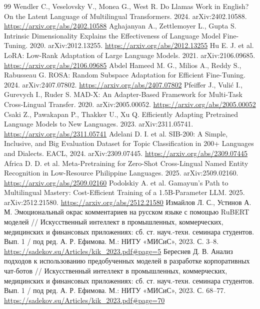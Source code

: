 \documentclass{misisarticle}
\begin{document}
\begin{thebibliography}{99}
 Wendler C., Veselovsky V., Monea G., West R. Do Llamas Work in English? On the Latent Language of Multilingual Transformers. 2024. arXiv:2402.10588. \url{https://arxiv.org/abs/2402.10588}
 Aghajanyan A., Zettlemoyer L., Gupta S. Intrinsic Dimensionality Explains the Effectiveness of Language Model Fine-Tuning. 2020. arXiv:2012.13255. \url{https://arxiv.org/abs/2012.13255}
 Hu E. J. et al. LoRA: Low-Rank Adaptation of Large Language Models. 2021. arXiv:2106.09685. \url{https://arxiv.org/abs/2106.09685}
 Abdel Hameed M. G., Milios A., Reddy S., Rabusseau G. ROSA: Random Subspace Adaptation for Efficient Fine-Tuning. 2024. arXiv:2407.07802. \url{https://arxiv.org/abs/2407.07802}
 Pfeiffer J., Vulić I., Gurevych I., Ruder S. MAD-X: An Adapter-Based Framework for Multi-Task Cross-Lingual Transfer. 2020. arXiv:2005.00052. \url{https://arxiv.org/abs/2005.00052}
 Csaki Z., Pawakapan P., Thakker U., Xu Q. Efficiently Adapting Pretrained Language Models to New Languages. 2023. arXiv:2311.05741. \url{https://arxiv.org/abs/2311.05741}
 Adelani D. I. et al. SIB-200: A Simple, Inclusive, and Big Evaluation Dataset for Topic Classification in 200+ Languages and Dialects. EACL, 2024. arXiv:2309.07445. \url{https://arxiv.org/abs/2309.07445}
 Africa D. D. et al. Meta-Pretraining for Zero-Shot Cross-Lingual Named Entity Recognition in Low-Resource Philippine Languages. 2025. arXiv:2509.02160. \url{https://arxiv.org/abs/2509.02160}
 Podolskiy A. et al. Gamayun's Path to Multilingual Mastery: Cost-Efficient Training of a 1.5B-Parameter LLM. 2025. arXiv:2512.21580. \url{https://arxiv.org/abs/2512.21580}
 Измайлов Л. С., Устинов А. М. Эмоциональный окрас комментариев на русском языке с помощью RuBERT моделей // Искусственный интеллект в промышленных, коммерческих, медицинских и финансовых приложениях: сб. ст. науч.-техн. семинара студентов. Вып. 1 / под ред. А. Р. Ефимова. М.: НИТУ «МИСиС», 2023. С. 3–8. \url{https://sadekov.su/Articles/kik_2023.pdf#page=5}
 Береснев Д. В. Анализ подходов к использованию предобученных моделей в разработке корпоративных чат-ботов // Искусственный интеллект в промышленных, коммерческих, медицинских и финансовых приложениях: сб. ст. науч.-техн. семинара студентов. Вып. 1 / под ред. А. Р. Ефимова. М.: НИТУ «МИСиС», 2023. С. 68–77. \url{https://sadekov.su/Articles/kik_2023.pdf#page=70}
\end{thebibliography}
\end{document}
